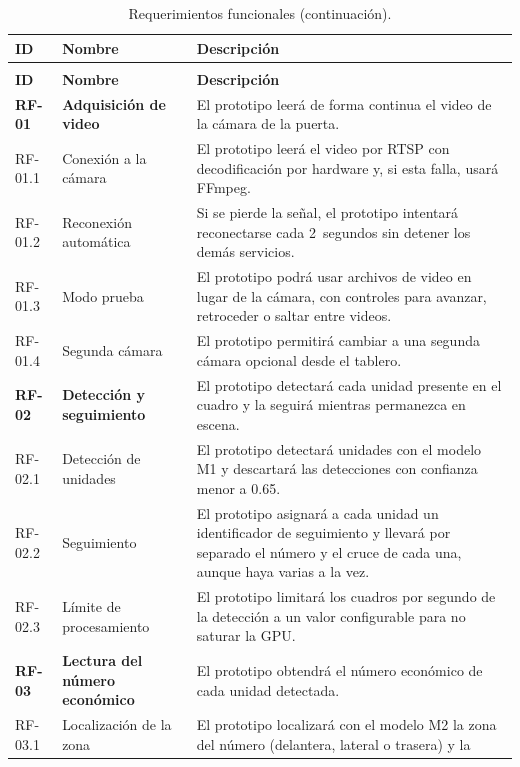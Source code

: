 {\small
\begin{longtable}{@{}L{1.5cm}L{3.6cm}L{8.9cm}@{}}
  \caption{Requerimientos funcionales.}
  \label{tab:rf} \\
  \toprule
  \textbf{ID} & \textbf{Nombre} & \textbf{Descripción} \\
  \midrule
  \endfirsthead
  \caption[]{Requerimientos funcionales (continuación).} \\
  \toprule
  \textbf{ID} & \textbf{Nombre} & \textbf{Descripción} \\
  \midrule
  \endhead
  \textbf{RF-01} & \textbf{Adquisición de video} & El prototipo leerá de
    forma continua el video de la cámara de la puerta. \\
  RF-01.1 & Conexión a la cámara & El prototipo leerá el video por RTSP
    con decodificación por hardware y, si esta falla, usará FFmpeg. \\
  RF-01.2 & Reconexión automática & Si se pierde la señal, el prototipo
    intentará reconectarse cada 2~segundos sin detener los demás
    servicios. \\
  RF-01.3 & Modo prueba & El prototipo podrá usar archivos de video en
    lugar de la cámara, con controles para avanzar, retroceder o saltar
    entre videos. \\
  RF-01.4 & Segunda cámara & El prototipo permitirá cambiar a una segunda
    cámara opcional desde el tablero. \\
  \midrule
  \textbf{RF-02} & \textbf{Detección y seguimiento} & El prototipo
    detectará cada unidad presente en el cuadro y la seguirá mientras
    permanezca en escena. \\
  RF-02.1 & Detección de unidades & El prototipo detectará unidades con el
    modelo M1 y descartará las detecciones con confianza menor a 0.65. \\
  RF-02.2 & Seguimiento & El prototipo asignará a cada unidad un
    identificador de seguimiento y llevará por separado el número y el
    cruce de cada una, aunque haya varias a la vez. \\
  RF-02.3 & Límite de procesamiento & El prototipo limitará los cuadros
    por segundo de la detección a un valor configurable para no saturar
    la GPU. \\
  \midrule
  \textbf{RF-03} & \textbf{Lectura del número económico} & El prototipo
    obtendrá el número económico de cada unidad detectada. \\
  RF-03.1 & Localización de la zona & El prototipo localizará con el
    modelo M2 la zona del número (delantera, lateral o trasera) y la

\end{longtable}}
